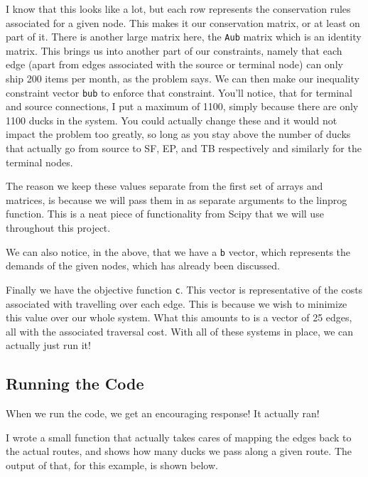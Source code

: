 \documentclass[11pt]{article}
\begin{document}
    I know that this looks like a lot, but each row represents the conservation
    rules associated for a given node. This makes it our conservation matrix,
    or at least on part of it. There is another large matrix here, the
    \texttt{Aub} matrix which is an identity matrix. This brings us into
    another part of our constraints, namely that each edge (apart from edges
    associated with the source or terminal node) can only ship 200 items per
    month, as the problem says. We can then make our inequality constraint
    vector \texttt{bub} to enforce that constraint. You'll notice, that for
    terminal and source connections, I put a maximum of 1100, simply because
    there are only 1100 ducks in the system. You could actually change these
    and it would not impact the problem too greatly, so long as you stay above
    the number of ducks that actually go from source to SF, EP, and TB
    respectively and similarly for the terminal nodes.

    The reason we keep these values separate from the first set of arrays and
    matrices, is because we will pass them in as separate arguments to the
    linprog function. This is a neat piece of functionality from Scipy that we
    will use throughout this project.

    We can also notice, in the above, that we have a \texttt{b} vector, which
    represents the demands of the given nodes, which has already been
    discussed.

    Finally we have the objective function \texttt{c}. This vector is
    representative of the costs associated with travelling over each edge. This
    is because we wish to minimize this value over our whole
    system. What this amounts to is a vector of 25 edges, all with the
    associated traversal cost. With all of these systems in place, we can
    actually just run it!

    \newpage

    \subsection{Running the Code}
    When we run the code, we get an encouraging response! It actually ran!

    I wrote a small function that actually takes cares of mapping the edges
    back to the actual routes, and shows how many ducks we pass along a given
    route. The output of that, for this example, is shown below.
\end{document}
